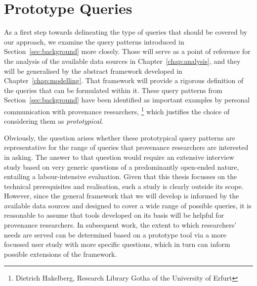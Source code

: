 \chapter{Prototype Queries}
\label{chap:prototype_queries}

As a first step towards delineating the type of queries that should be covered by our approach,
we examine the query patterns introduced in Section~\ref{sec:background} more closely.
Those will serve as a point of reference for the analysis of the available data sources
in Chapter~\ref{chap:analysis},
and they will be generalised by the abstract framework developed in Chapter~\ref{chap:modelling}.
That framework will provide a rigorous definition of the queries that can be formulated
within it.
These query patterns from Section~\ref{sec:background} have been identified
as important examples by personal communication
with provenance researchers,%
\footnote{Dietrich Hakelberg, Research Library Gotha of the University of Erfurt}
which justifies the choice of considering them as \emph{prototypical}.

Obviously, the question arises whether these prototypical query patterns are representative
for the range of queries that provenance researchers are interested in asking.
The answer to that question would require an extensive interview study
based on very generic questions of a predominantly open-ended nature,
entailing a labour-intensive evaluation.
Given that this thesis focusses on the technical prerequisites and realisation,
such a study is clearly outside its scope. However, since the general framework that we will develop
is informed by the available data sources
and designed to cover a wide range of possible queries,
it is reasonable to assume that tools developed on its basis will be helpful for provenance researchers.
In subsequent work, the extent to which researchers' needs are served can
be determined based on a prototype tool via a more focussed user study
with more specific questions, which in turn can inform possible extensions of the framework.

